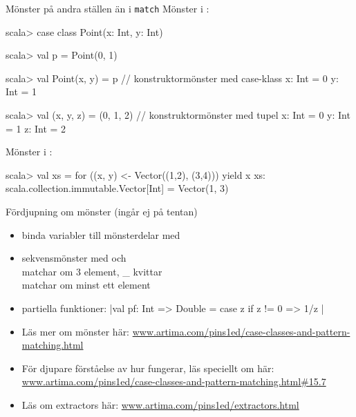 \begin{Slide}{Mönster på andra ställen än i \texttt{match}}\SlideFontSmall
Mönster i :
\vspace{-0.25em}\begin{REPL}
scala> case class Point(x: Int, y: Int)

scala> val p = Point(0, 1)

scala> val Point(x, y) = p          // konstruktormönster med case-klass
x: Int = 0
y: Int = 1

scala> val (x, y, z) = (0, 1, 2)    // konstruktormönster med tupel
x: Int = 0
y: Int = 1
z: Int = 2

\end{REPL}
Mönster i :
\vspace{-0.25em}\begin{REPL}
scala> val xs = for ((x, y) <- Vector((1,2), (3,4))) yield x
xs: scala.collection.immutable.Vector[Int] = Vector(1, 3)
\end{REPL}
\end{Slide}

\begin{Slide}{Fördjupning om mönster (ingår ej på tentan)}\SlideFontSmall
\begin{itemize}
\item binda variabler till mönsterdelar med  \\

\item sekvensmönster med \code{_} och \code{_*} 
\\   matchar om 3 element, \_ kvittar
\\   matchar om minst ett element

\item partiella funktioner: \code|val pf: Int => Double = { case z if z != 0 => 1/z }|

\item Läs mer om mönster här:  \href{http://www.artima.com/pins1ed/case-classes-and-pattern-matching.html}{\SlideFontTiny www.artima.com/pins1ed/case-classes-and-pattern-matching.html}

\item För djupare förståelse av hur  fungerar, läs speciellt om  här: \href{http://www.artima.com/pins1ed/case-classes-and-pattern-matching.html\#15.7}{\SlideFontTiny www.artima.com/pins1ed/case-classes-and-pattern-matching.html\#15.7}

\item Läs om extractors här: \href{http://www.artima.com/pins1ed/extractors.html}{\SlideFontTiny www.artima.com/pins1ed/extractors.html}

\end{itemize}
\end{Slide}


